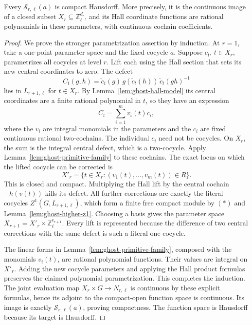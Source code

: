\begin{proposition}
\label{prop:ghost-compact-fibres}
Every \(\mathscr S_{r,\ell}(a)\) is compact Hausdorff. More
precisely, it is the continuous image of a closed subset
\(X_r\subseteq\mathbb Z_\ell^{d_r}\), and its Hall coordinate
functions are rational polynomials in these parameters, with
continuous cochain coefficients.
\end{proposition}
\begin{proof}
We prove the stronger parametrization assertion by induction.
At \(r=1\), take a one-point parameter space and the fixed
cocycle \(a\). Suppose \(c_t\), \(t\in X_r\), parametrizes
all cocycles at level \(r\). Lift each using the Hall section
that sets its new central coordinates to zero. The defect
\[
 C_t(g,h)=\widetilde c_t(g)\,
          g(\widetilde c_t(h))\,
          \widetilde c_t(gh)^{-1}
\]
lies in \(L_{r+1,\ell}\) for \(t\in X_r\). By
Lemma~\ref{lem:ghost-hall-model} its central coordinates are a
finite rational polynomial in \(t\), so they have an expression
\[
                  C_t=\sum_{i=1}^m v_i(t)c_i,
\]
where the \(v_i\) are integral monomials in the parameters and
the \(c_i\) are fixed continuous rational two-cochains.
The individual \(c_i\) need not be cocycles. On \(X_r\), the
sum is the integral central defect, which is a two-cocycle.
Apply Lemma~\ref{lem:ghost-primitive-family} to these cochains.
The exact locus on which the lifted cocycle can be corrected is
\[
          X'_r=\{t\in X_r:(v_1(t),\ldots,v_m(t))\in R\}.
\]
This is closed and compact. Multiplying the Hall lift by the
central cochain \(-h(v(t))\) kills its defect. All further
corrections are exactly the literal cocycles
\(Z^1(G,L_{r+1,\ell})\), which form a finite free compact module
by \((\ast)\) and Lemma~\ref{lem:ghost-higher-z1}. Choosing a
basis gives the parameter space
\(X_{r+1}=X'_r\times\mathbb Z_\ell^{e_{r+1}}\).
Every lift is represented because the difference of two central
corrections with the same defect is such a literal one-cocycle.

The linear forms in Lemma~\ref{lem:ghost-primitive-family},
composed with the monomials \(v_i(t)\), are rational polynomial
functions. Their values are integral on \(X'_r\). Adding the
new cocycle parameters and applying the Hall product formulas
preserves the claimed polynomial parametrization. This completes
the induction. The joint evaluation map
\(X_r\times G\to N_{r,\ell}\) is continuous by these explicit
formulas, hence its adjoint to the compact-open function space
is continuous. Its image is exactly
\(\mathscr S_{r,\ell}(a)\), proving compactness. The function
space is Hausdorff because its target is Hausdorff.
\end{proof}

